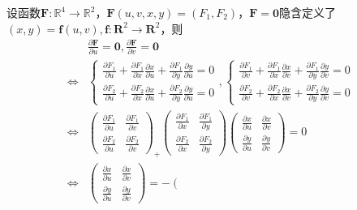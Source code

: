 \documentclass[main.tex]{subfiles}
\begin{document}
\begin{example}
设函数$\mathbf{F}:\mathbb{R}^4\rightarrow\mathbb{R}^2$，$\mathbf{F}\left(u,v,x,y\right)=\left(F_1,F_2\right)$，$\mathbf{F}=\mathbf{0}$隐含定义了$\left(x,y\right)=\mathbf{f}\left(u,v\right),\mathbf{f}:\mathbf{R}^2\rightarrow\mathbf{R}^2$，则
\begin{align*}
    &\frac{\partial \mathbf{F}}{\partial u}=\mathbf{0},\frac{\partial \mathbf{F}}{\partial v}=\mathbf{0}\\
    \Leftrightarrow&\left\{\begin{array}{l}
    \frac{\partial F_1}{\partial u}+\frac{\partial F_1}{\partial x}\frac{\partial x}{\partial u}+\frac{\partial F_1}{\partial y}\frac{\partial y}{\partial u}=0\\
    \frac{\partial F_2}{\partial u}+\frac{\partial F_2}{\partial x}\frac{\partial x}{\partial u}+\frac{\partial F_2}{\partial y}\frac{\partial y}{\partial u}=0
    \end{array}\right.,\left\{\begin{array}{l}
    \frac{\partial F_1}{\partial v}+\frac{\partial F_1}{\partial x}\frac{\partial x}{\partial v}+\frac{\partial F_1}{\partial y}\frac{\partial y}{\partial v}=0\\
    \frac{\partial F_2}{\partial v}+\frac{\partial F_2}{\partial x}\frac{\partial x}{\partial v}+\frac{\partial F_2}{\partial y}\frac{\partial y}{\partial v}=0
    \end{array}\right.\\
    \Leftrightarrow&\left(\begin{array}{cc}
    \frac{\partial F_1}{\partial u}&\frac{\partial F_1}{\partial v}\\\frac{\partial F_2}{\partial u}&\frac{\partial F_2}{\partial v}\end{array}\right)_+\left(\begin{array}{cc}
    \frac{\partial F_1}{\partial x}&\frac{\partial F_1}{\partial y}\\\frac{\partial F_2}{\partial x}&\frac{\partial F_2}{\partial y}\end{array}\right)\left(\begin{array}{cc}
    \frac{\partial x}{\partial u}&\frac{\partial x}{\partial v}\\\frac{\partial y}{\partial u}&\frac{\partial y}{\partial v}\end{array}\right)=0\\
    \Leftrightarrow&\left(\begin{array}{cc}
    \frac{\partial x}{\partial u}&\frac{\partial x}{\partial v}\\\frac{\partial y}{\partial u}&\frac{\partial y}{\partial v}\end{array}\right)=-\left(\begin{array}{cc}

\end{array}
\end{align*}
\end{example}
\end{document}
